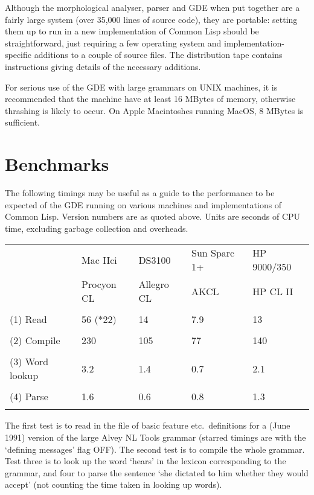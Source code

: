 Although the morphological analyser, parser and GDE when put together
are a fairly large system (over 35,000 lines of source code), they are portable:
setting them up to run in a new implementation of Common Lisp should be
straightforward, just requiring a few operating system and
implementation-specific additions to a couple of source files.  
The distribution tape contains instructions giving details of the
necessary additions.

For serious use of the GDE with large grammars on UNIX machines, it
is recommended that the machine have at least 16 MBytes of memory,
otherwise thrashing is likely to occur. On Apple Macintoshes running
MacOS, 8 MBytes is sufficient. 

\section{Benchmarks}

The following timings may be useful as a guide to the performance to
be expected of the GDE running on various machines and implementations
of Common Lisp. Version numbers are as quoted above. Units are seconds
of CPU time, excluding garbage collection and overheads.

\begin{minipage}[t]{6.0in}
\begin{tabular}{lllll}
\\
                & Mac IIci   & DS3100     & Sun Sparc 1+ & HP 9000/350\\
                & Procyon CL & Allegro CL & AKCL         & HP CL II\\
\\
(1) Read        & 56 (*22)   & 14         & 7.9          & 13\\
\\
(2) Compile     & 230        & 105        & 77           & 140\\
\\
(3) Word lookup & 3.2        & 1.4        & 0.7          & 2.1\\
\\
(4) Parse       & 1.6        & 0.6        & 0.8          & 1.3\\
\\
\end{tabular}
\end{minipage}

The first test is to read in the file of basic feature etc.\ definitions for a
(June 1991) version of the large Alvey NL Tools grammar (starred
timings are with the `defining messages' flag OFF). The second test is to
compile the whole grammar. Test three is to look up the word `hears' in the
lexicon corresponding to the grammar, and four to parse the sentence
`she dictated to him whether they would accept' (not counting the time taken
in looking up words).



